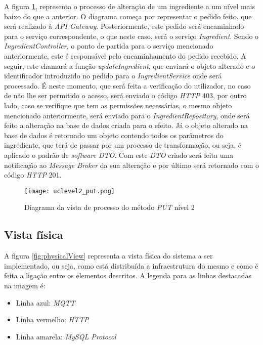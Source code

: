 A figura \ref{fig:processPUT2}, representa o processo de alteração de um ingrediente a um nível mais baixo do que a anterior. O diagrama começa por representar o pedido feito, que será realizado à \textit{API Gateway}. Posteriormente, este pedido será encaminhado para o serviço correspondente, o que neste caso, será o serviço \textit{Ingredient}. Sendo o \textit{IngredientController}, o ponto de partida para o serviço mencionado anteriormente, este é responsável pelo encaminhamento do pedido recebido. A seguir, este chamará a função \textit{updateIngredient}, que enviará o objeto alterado e o identificador introduzido no pedido para o \textit{IngredientService} onde será processado. É neste momento, que será feita a verificação do utilizador, no caso de não lhe ser permitido o acesso, será enviado o código \textit{HTTP} 403, por outro lado, caso se verifique que tem as permissões necessárias, o mesmo objeto mencionado anteriormente, será enviado para o \textit{IngredientRepository}, onde será feito a alteração na base de dados criada para o efeito. Já o objeto alterado na base de dados é retornado um objeto contendo todos os parâmetros do ingrediente, que terá de passar por um processo de transformação, ou seja, é aplicado o padrão de \textit{software} \textit{DTO}. Com este \textit{DTO} criado será feita uma notificação ao \textit{Message Broker} da sua alteração e por último será retornado com o código \textit{HTTP} 201.

\begin{figure}[H]
    \centering
    \texttt{[image: uclevel2\_put.png]}
    \caption{Diagrama da vista de processo do método \textit{PUT} nível 2}
    \label{fig:processPUT2}
\end{figure}

\subsection{Vista física}

A figura \ref{fig:physicalView} representa a vista física do sistema a ser implementado, ou seja, como está distribuída a infraestrutura do mesmo e como é feita a ligação entre os elementos descritos. A legenda para as linhas destacadas na imagem é:
\begin{itemize}
    \item Linha azul: \textit{MQTT}
    \item Linha vermelho: \textit{HTTP}
    \item Linha amarela: \textit{MySQL Protocol}
\end{itemize}

